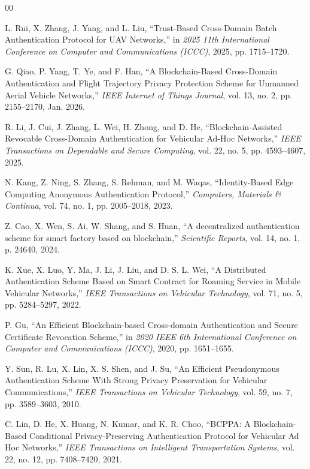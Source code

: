 \documentclass[conference]{IEEEtran}
\begin{document}
	\begin{thebibliography}{00}
		
		 L. Rui, X. Zhang, J. Yang, and L. Liu, ``Trust-Based Cross-Domain Batch Authentication Protocol for UAV Networks,'' in \emph{2025 11th International Conference on Computer and Communications (ICCC)}, 2025, pp. 1715--1720.
		
		 G. Qiao, P. Yang, T. Ye, and F. Han, ``A Blockchain-Based Cross-Domain Authentication and Flight Trajectory Privacy Protection Scheme for Unmanned Aerial Vehicle Networks,'' \emph{IEEE Internet of Things Journal}, vol. 13, no. 2, pp. 2155--2170, Jan. 2026.
		
		 R. Li, J. Cui, J. Zhang, L. Wei, H. Zhong, and D. He, ``Blockchain-Assisted Revocable Cross-Domain Authentication for Vehicular Ad-Hoc Networks,'' \emph{IEEE Transactions on Dependable and Secure Computing}, vol. 22, no. 5, pp. 4593--4607, 2025.
		
		 N. Kang, Z. Ning, S. Zhang, S. Rehman, and M. Waqas, ``Identity-Based Edge Computing Anonymous Authentication Protocol,'' \emph{Computers, Materials \& Continua}, vol. 74, no. 1, pp. 2005--2018, 2023.
		
		 Z. Cao, X. Wen, S. Ai, W. Shang, and S. Huan, ``A decentralized authentication scheme for smart factory based on blockchain,'' \emph{Scientific Reports}, vol. 14, no. 1, p. 24640, 2024.
		
		 K. Xue, X. Luo, Y. Ma, J. Li, J. Liu, and D. S. L. Wei, ``A Distributed Authentication Scheme Based on Smart Contract for Roaming Service in Mobile Vehicular Networks,'' \emph{IEEE Transactions on Vehicular Technology}, vol. 71, no. 5, pp. 5284--5297, 2022.
		
		 P. Gu, ``An Efficient Blockchain-based Cross-domain Authentication and Secure Certificate Revocation Scheme,'' in \emph{2020 IEEE 6th International Conference on Computer and Communications (ICCC)}, 2020, pp. 1651--1655.
		
		 Y. Sun, R. Lu, X. Lin, X. S. Shen, and J. Su, ``An Efficient Pseudonymous Authentication Scheme With Strong Privacy Preservation for Vehicular Communications,'' \emph{IEEE Transactions on Vehicular Technology}, vol. 59, no. 7, pp. 3589--3603, 2010.
		
		 C. Lin, D. He, X. Huang, N. Kumar, and K. R. Choo, ``BCPPA: A Blockchain-Based Conditional Privacy-Preserving Authentication Protocol for Vehicular Ad Hoc Networks,'' \emph{IEEE Transactions on Intelligent Transportation Systems}, vol. 22, no. 12, pp. 7408--7420, 2021.
		

\end{thebibliography}
\end{document}
